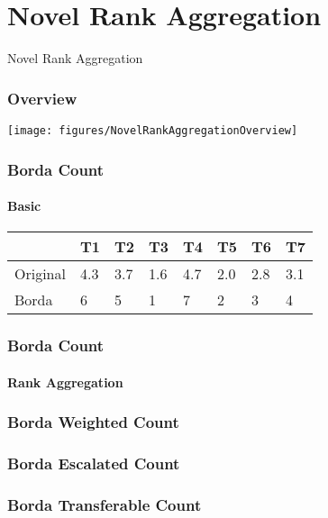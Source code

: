 \section{Novel Rank Aggregation}

\begin{frame}
	\begin{center}
		\huge Novel Rank Aggregation
	\end{center}
\end{frame}

\begin{frame}
	\frametitle{Overview}
	\centering
	\texttt{[image: figures/NovelRankAggregationOverview]}
\end{frame}

\begin{frame}
	\frametitle{Borda Count}
	\framesubtitle{Basic}
	\centering
	\begin{tabular}{|l|l|l|l|l|l|l|l|}
		\hline
		& T1  & T2  & T3  & T4  & T5  & T6  & T7  \\ \hline
		Original & 4.3 & 3.7 & 1.6 & 4.7 & 2.0 & 2.8 & 3.1 \\ \hline
		Borda    & 6   & 5   & 1   & 7   & 2   & 3   & 4   \\ \hline
	\end{tabular}
\end{frame}

\begin{frame}
	\frametitle{Borda Count}
	\framesubtitle{Rank Aggregation}
	
\end{frame}

\begin{frame}
	\frametitle{Borda Weighted Count}
	
\end{frame}

\begin{frame}
	\frametitle{Borda Escalated Count}
	
\end{frame}

\begin{frame}
	\frametitle{Borda Transferable Count}
	
\end{frame}